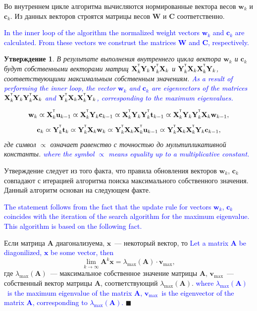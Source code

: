 \documentclass[12pt,twoside]{article}
\newtheorem{statement}{Утверждение}
\newcommand{\bx}{\mathbf{x}}
\newcommand{\bw}{\mathbf{w}}
\newcommand{\bY}{\mathbf{Y}}
\newcommand{\bX}{\mathbf{X}}
\newcommand{\bu}{\mathbf{u}}
\newcommand{\bt}{\mathbf{t}}
\newcommand{\bc}{\mathbf{c}}
\newcommand{\bC}{\mathbf{C}}
\newcommand{\bW}{\mathbf{W}}
\newcommand{\T}{^{\text{\tiny\sffamily\upshape\mdseries T}}}
\begin{document}
Во внутреннем цикле алгоритма вычисляются нормированные вектора весов $\bw_k$ и $\bc_k$. Из данных векторов строятся матрицы весов $\bW$ и $\bC$ соответственно.

\textcolor{blue}{
In the inner loop of the algorithm the normalized weight vectors $\bw_k$ and $\bc_k$ are calculated. From these vectors we construst the matrices $\bW$ and $\bC$, respectively.}

\begin{statement}
	В результате выполнения внутреннего цикла вектора $\bw_k$ и $\bc_k$ будут собственными векторами матриц $\bX_k^{\T} \bY_k \bY_k^{\T} \bX_k$ и $\bY_k^{\T} \bX_k \bX_k^{\T} \bY_k$, соответствующими максимальным собственным значениям.
	\textcolor{blue}{
	As a result of performing the inner loop, the vector $\bw_k$ and $\bc_k$ are eigenvectors of the matrices $\bX_k^{\T} \bY_k \bY_k^{\T} \bX_k$ and $\bY_k^{\T} \bX_k \bX_k^{\T} \bY_k$, corresponding to the maximum eigenvalues.}
	
	\begin{equation*}
	\bw_k \varpropto \bX_k^{\T} \bu_{k-1} \varpropto \bX_k^{\T} \bY_k \bc_{k-1} \varpropto \bX_k^{\T} \bY_k \bY_k^{\T} \bt_{k-1} \varpropto \bX_k^{\T} \bY_k \bY_k^{\T} \bX_k \bw_{k-1},
	\end{equation*}
	\begin{equation*}
	\bc_k \varpropto \bY_k^{\T} \bt_k \varpropto \bY_k^{\T} \bX_k \bw_k \varpropto \bY_k^{\T} \bX_k \bX_k^{\T} \bu_{k-1} \varpropto \bY_k^{\T} \bX_k \bX_k^{\T} \bY_k \bc_{k-1},
	\end{equation*}
	где символ $\varpropto$ означает равенство с точностью до мультипликативной константы. 
	\textcolor{blue}{
	where the symbol $\varpropto$ means equality up to a multiplicative constant.}
	\label{st::eig}
\end{statement}

Утверждение следует из того факта, что правила обновления векторов $\bw_k$, $\bc_k$ совпадают с итерацией алгоритма поиска максимального собственного значения. Данный алгоритм основан на следующем факте.

\textcolor{blue}{
The statement follows from the fact that the update rule for vectors $\bw_k$, $\bc_k$ coincides with the iteration of the search algorithm for the maximum eigenvalue. This algorithm is based on the following fact.}

Если матрица $\mathbf{A}$ диагонализуема, $\bx$~--- некоторый вектор, то
\textcolor{blue}{
Let a matrix $\mathbf{A}$ be diagonilized, $\bx$ be some vector, then}
\[
	\lim_{k \rightarrow \infty} \mathbf{A}^k \bx = \lambda_{\max}(\mathbf{A}) \cdot \mathbf{v}_{\max},
\]
где $\lambda_{\max} (\mathbf{A})$~--- максимальное собственное значение матрицы $\mathbf{A}$, $\mathbf{v}_{\max}$~---собственный вектор матрицы $\mathbf{A}$, соответствующий $ \lambda_{\max} (\mathbf{A})$.
\textcolor{blue}{
where $ \lambda_{\max} (\mathbf{A})$~is the maximum eigenvalue of the matrix $\mathbf{A}$, $\mathbf{v}_{\max}$~is the eigenvector of the matrix $\mathbf{A}$, corresponding to $ \lambda_{\max} (\mathbf{A})$.}
$\blacksquare$
\end{document}
